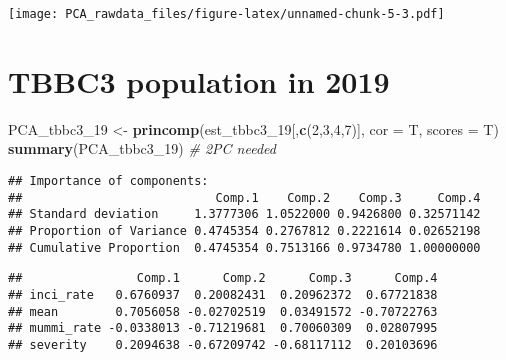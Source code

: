 \documentclass[]{article}
\newenvironment{Shaded}{\begin{snugshade}}{\end{snugshade}}
\newcommand{\CommentTok}[1]{\textcolor[rgb]{0.56,0.35,0.01}{\textit{#1}}}
\newcommand{\DataTypeTok}[1]{\textcolor[rgb]{0.13,0.29,0.53}{#1}}
\newcommand{\DecValTok}[1]{\textcolor[rgb]{0.00,0.00,0.81}{#1}}
\newcommand{\KeywordTok}[1]{\textcolor[rgb]{0.13,0.29,0.53}{\textbf{#1}}}
\newcommand{\NormalTok}[1]{#1}
\newcommand{\OperatorTok}[1]{\textcolor[rgb]{0.81,0.36,0.00}{\textbf{#1}}}
\newcommand{\StringTok}[1]{\textcolor[rgb]{0.31,0.60,0.02}{#1}}
\begin{document}
\texttt{[image: PCA\_rawdata\_files/figure-latex/unnamed-chunk-5-3.pdf]}

\hypertarget{tbbc3-population-in-2019}{%
\section{TBBC3 population in 2019}\label{tbbc3-population-in-2019}}

\begin{Shaded}
\begin{Highlighting}[]
\NormalTok{PCA_tbbc3_}\DecValTok{19}\NormalTok{ <-}\StringTok{ }\KeywordTok{princomp}\NormalTok{(est_tbbc3_}\DecValTok{19}\NormalTok{[,}\KeywordTok{c}\NormalTok{(}\DecValTok{2}\NormalTok{,}\DecValTok{3}\NormalTok{,}\DecValTok{4}\NormalTok{,}\DecValTok{7}\NormalTok{)], }\DataTypeTok{cor =}\NormalTok{ T, }\DataTypeTok{scores =}\NormalTok{ T)}
\KeywordTok{summary}\NormalTok{(PCA_tbbc3_}\DecValTok{19}\NormalTok{) }\CommentTok{# 2PC needed}
\end{Highlighting}
\end{Shaded}

\begin{verbatim}
## Importance of components:
##                           Comp.1    Comp.2    Comp.3     Comp.4
## Standard deviation     1.3777306 1.0522000 0.9426800 0.32571142
## Proportion of Variance 0.4745354 0.2767812 0.2221614 0.02652198
## Cumulative Proportion  0.4745354 0.7513166 0.9734780 1.00000000
\end{verbatim}

\begin{Shaded}
\end{Shaded}

\begin{verbatim}
##                Comp.1      Comp.2      Comp.3      Comp.4
## inci_rate   0.6760937  0.20082431  0.20962372  0.67721838
## mean        0.7056058 -0.02702519  0.03491572 -0.70722763
## mummi_rate -0.0338013 -0.71219681  0.70060309  0.02807995
## severity    0.2094638 -0.67209742 -0.68117112  0.20103696
\end{verbatim}

\begin{Shaded}
\end{Shaded}
\end{document}
